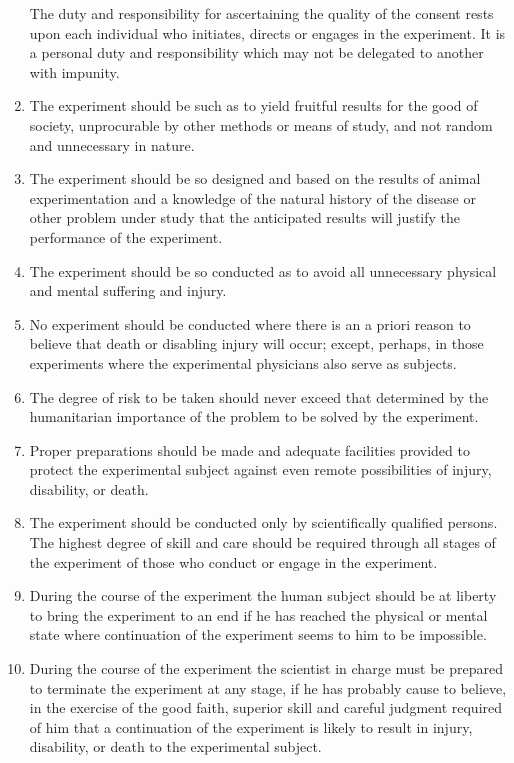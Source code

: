 \documentclass[12pt] {article}
\begin{document}
\begin{enumerate}
  The duty and responsibility for ascertaining the quality of the
  consent rests upon each individual who initiates, directs or engages
  in the experiment. It is a personal duty and responsibility which may
  not be delegated to another with impunity.
\item
  The experiment should be such as to yield fruitful results for the
  good of society, unprocurable by other methods or means of study, and
  not random and unnecessary in nature.
\item
  The experiment should be so designed and based on the results of
  animal experimentation and a knowledge of the natural history of the
  disease or other problem under study that the anticipated results will
  justify the performance of the experiment.
\item
  The experiment should be so conducted as to avoid all unnecessary
  physical and mental suffering and injury.
\item
  No experiment should be conducted where there is an a priori reason to
  believe that death or disabling injury will occur; except, perhaps, in
  those experiments where the experimental physicians also serve as
  subjects.
\item
  The degree of risk to be taken should never exceed that determined by
  the humanitarian importance of the problem to be solved by the
  experiment.
\item
  Proper preparations should be made and adequate facilities provided to
  protect the experimental subject against even remote possibilities of
  injury, disability, or death.
\item
  The experiment should be conducted only by scientifically qualified
  persons. The highest degree of skill and care should be required
  through all stages of the experiment of those who conduct or engage in
  the experiment.
\item
  During the course of the experiment the human subject should be at
  liberty to bring the experiment to an end if he has reached the
  physical or mental state where continuation of the experiment seems to
  him to be impossible.
\item
  During the course of the experiment the scientist in charge must be
  prepared to terminate the experiment at any stage, if he has probably
  cause to believe, in the exercise of the good faith, superior skill
  and careful judgment required of him that a continuation of the
  experiment is likely to result in injury, disability, or death to the
  experimental subject.
\end{enumerate}
\end{document}
